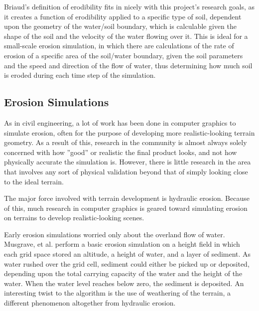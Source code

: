 Briaud's definition of erodibility fits in nicely with this project's research goals, as it creates a function of erodibility applied to a specific type of soil, dependent upon the geometry of the water/soil boundary, which is calculable given the shape of the soil and the velocity of the water flowing over it. This is ideal for a small-scale erosion simulation, in which there are calculations of 
the rate of erosion of a specific area of the soil/water boundary, given the soil parameters and the speed and direction of the flow of water, thus determining how much soil is eroded during each time step of the simulation.


\subsection{Erosion Simulations}
\label{section:PriorLiteratureErosionSimulation}

As in civil engineering, a lot of work has been done in computer graphics to simulate erosion, often for the purpose of developing more realistic-looking terrain geometry. As a result of this, research in the community is almost always solely concerned with how ''good'' or realistic the final product looks, and not how physically accurate the simulation is. However, there is little research in the area that involves any sort of physical validation beyond that of simply looking close to the ideal terrain. 


The major force involved with terrain development is hydraulic erosion. Because of this, much research in computer graphics is geared toward simulating erosion on terrains to develop realistic-looking scenes.

Early erosion simulations worried only about the overland flow of water. Musgrave, et al. \cite{Musgrave-SynthesisAndRendering} perform a basic erosion simulation on a height field in which each grid space stored an altitude, a height of water, and a layer of sediment. As water rushed over the grid cell, sediment could either be picked up or deposited, depending upon the total carrying capacity of the water and the height of the water. When the water level reaches below zero, the sediment is deposited. An interesting twist to the algorithm is the use of weathering of the terrain, a different phenomenon altogether from hydraulic erosion.

